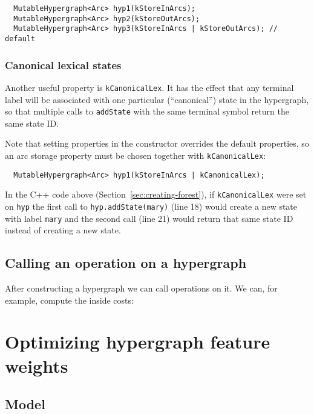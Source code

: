 \documentclass[12pt]{article}
\newcommand{\yellowlisting}[1]{%
  }
\newcommand{\secref}[1]{Section~\ref{sec:#1}}
\begin{document}
\begin{lstlisting}
  MutableHypergraph<Arc> hyp1(kStoreInArcs);
  MutableHypergraph<Arc> hyp2(kStoreOutArcs);
  MutableHypergraph<Arc> hyp3(kStoreInArcs | kStoreOutArcs); // default
\end{lstlisting}

\subsubsection{Canonical lexical states}

Another useful property is \texttt{kCanonicalLex}. It has the effect
that any terminal label will be associated with one particular
(``canonical'') state in the hypergraph, so that multiple calls to
\texttt{addState} with the same terminal symbol return the same state
ID.

Note that setting properties in the constructor overrides the default
properties, so an arc storage property must be chosen together with
\texttt{kCanonicalLex}:

\begin{lstlisting}
  MutableHypergraph<Arc> hyp1(kStoreInArcs | kCanonicalLex);
\end{lstlisting}

In the C++ code above (\secref{creating-forest}), if
\texttt{kCanonicalLex} were set on \texttt{hyp} the first call to
\texttt{hyp.addState(mary)} (line 18) would create a new state with
label \texttt{mary} and the second call (line 21) would return that
same state ID instead of creating a new state.

\subsection{Calling an operation on a hypergraph}

After constructing a hypergraph we can call operations on it. We can,
for example, compute the inside costs:

\lstset{
  firstnumber=27
}
\yellowlisting{Inside.hpp}

\section{Optimizing hypergraph feature weights}\label{sec:optimize}

\subsection{Model}\label{sec:model}
\end{document}
